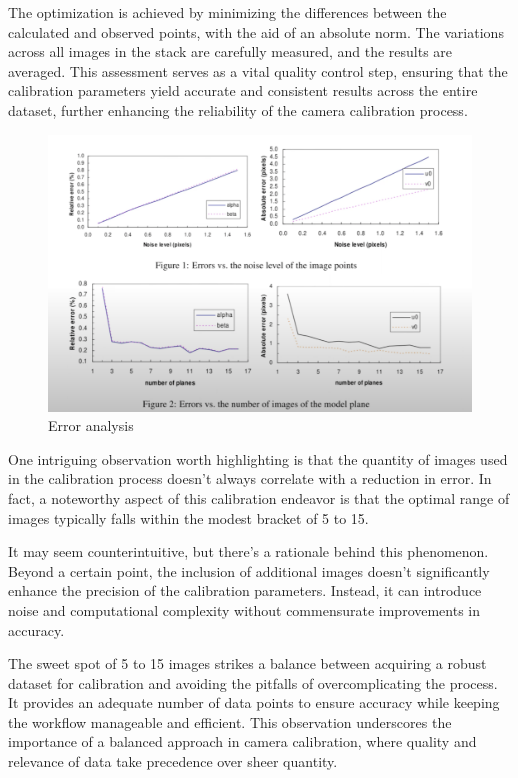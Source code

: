 \documentclass{article}
\begin{document}
The optimization is achieved by minimizing the differences between the calculated and observed points, with the aid of an absolute norm. The variations across all images in the stack are carefully measured, and the results are averaged. This  assessment serves as a vital quality control step, ensuring that the calibration parameters yield accurate and consistent results across the entire dataset, further enhancing the reliability of the camera calibration process.


\begin{figure}[h]
    \centering
    \includegraphics[scale=0.2]{Images/Screen Shot 2023-10-21 at 1.09.31 PM.png}
    \caption{Error analysis}
    \label{k}
\end{figure}

One intriguing observation worth highlighting is that the quantity of images used in the calibration process doesn't always correlate with a reduction in error. In fact, a noteworthy aspect of this calibration endeavor is that the optimal range of images typically falls within the modest bracket of 5 to 15.

It may seem counterintuitive, but there's a rationale behind this phenomenon. Beyond a certain point, the inclusion of additional images doesn't significantly enhance the precision of the calibration parameters. Instead, it can introduce noise and computational complexity without commensurate improvements in accuracy.

The sweet spot of 5 to 15 images strikes a balance between acquiring a robust dataset for calibration and avoiding the pitfalls of overcomplicating the process. It provides an adequate number of data points to ensure accuracy while keeping the workflow manageable and efficient. This observation underscores the importance of a balanced approach in camera calibration, where quality and relevance of data take precedence over sheer quantity.



\nocite{*}
\printbibliography
\end{document}
